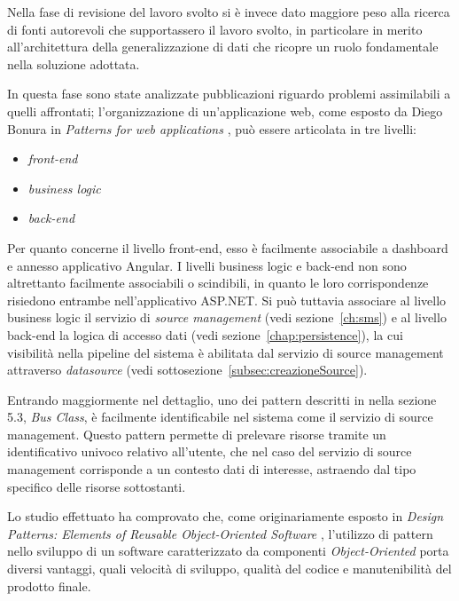 
Nella fase di revisione del lavoro svolto si è invece dato maggiore peso alla ricerca di fonti autorevoli che supportassero il lavoro svolto, in particolare in merito all'architettura della generalizzazione di dati che ricopre un ruolo fondamentale nella soluzione adottata.

In questa fase sono state analizzate pubblicazioni riguardo problemi assimilabili a quelli affrontati; l'organizzazione di un'applicazione web, come esposto da Diego Bonura in \textit{Patterns for web applications} \cite{DBLP:conf/seke/BonuraCM02}, può essere articolata in tre livelli:
\begin{itemize}
\item
\textit{front-end}
\item
\textit{business logic}
\item
\textit{back-end}
\end{itemize}

Per quanto concerne il livello front-end, esso è facilmente associabile a dashboard e annesso applicativo Angular.
I livelli business logic e back-end non sono altrettanto facilmente associabili o scindibili, in quanto le loro corrispondenze risiedono entrambe nell'applicativo ASP.NET. Si può tuttavia associare al livello business logic il servizio di \textit{source management} (vedi sezione~\ref{ch:sms}) e al livello back-end la logica di accesso dati (vedi sezione~\ref{chap:persistence}), la cui visibilità nella pipeline del sistema è abilitata dal servizio di source management attraverso \textit{datasource} (vedi sottosezione~\ref{subsec:creazioneSource}).

Entrando maggiormente nel dettaglio, uno dei pattern descritti in \cite{DBLP:conf/seke/BonuraCM02} nella sezione 5.3, \textit{Bus Class}, è facilmente identificabile nel sistema come il servizio di source management. Questo pattern permette di prelevare risorse tramite un identificativo univoco relativo all'utente, che nel caso del servizio di source management corrisponde a un contesto dati di interesse, astraendo dal tipo specifico delle risorse sottostanti.

Lo studio effettuato ha comprovato che, come originariamente esposto in \textit{Design Patterns: Elements of Reusable Object-Oriented Software} \cite{GOF}, l'utilizzo di pattern nello sviluppo di un software caratterizzato da componenti \textit{Object-Oriented} porta diversi vantaggi, quali velocità di sviluppo, qualità del codice e manutenibilità del prodotto finale.

